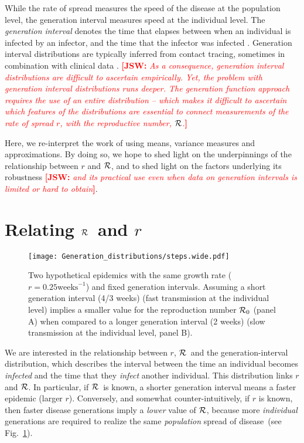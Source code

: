 \documentclass[12pt,]{article}
\newcommand{\RR}{\ensuremath{{\cal R}}}
\newcommand{\Rx}[1]{\ensuremath{{\cal R}_{#1}}}
\newcommand{\Ro}{\Rx{0}}
\newcommand{\fref}[1]{Fig.~\ref{fig:#1}}
\newcommand{\comment}[3]{\textcolor{#1}{\textbf{[#2: }\textit{#3}\textbf{]}}}
\newcommand{\jsw}[1]{\comment{red}{JSW}{#1}}
\begin{document}
While the rate of spread measures the speed of the disease at the population level, the generation interval measures speed at the individual level.
The \emph{generation interval} denotes the time that elapses between when an individual is infected by an infector, and the time that the infector was infected \cite{Sven07}.
Generation interval distributions are typically inferred from contact tracing, sometimes in combination with clinical data \cite{GenerationMeasurement}.
\jsw{As a consequence, generation interval distributions are difficult to ascertain empirically. Yet, the problem with generation interval distributions runs deeper. The generation function approach requires the use of an entire distribution -- which makes it difficult to ascertain which features of the distributions are essential to connect measurements of the rate of spread $r$, with the reproductive number, \RR.}

Here, we re-interpret the work of \cite{WallLips07} using means, variance measures and approximations.
By doing so, we hope to shed light on the underpinnings of the relationship between $r$ and \RR, and to shed light on the factors underlying its robustness \jsw{and its practical use even when data on generation intervals is limited or hard to obtain}.

\section{Relating \RR\ and $r$}

\begin{figure}[htbp] \centering
	\texttt{[image: Generation\_distributions/steps.wide.pdf]}
	\caption{Two hypothetical epidemics with the same growth rate ($r=0.25 \mathrm{weeks}^{-1}$) and fixed generation intervals.  Assuming a short generation interval (4/3 weeks) (fast transmission at the individual level) implies a smaller value for the reproduction number $\Ro$ (panel A) when compared to a longer generation interval (2 weeks) (slow transmission at the individual level, panel B). 
	\label{fig:link}}
\end{figure}

We are interested in the relationship between $r$, \RR~and the generation-interval distribution, which describes the interval between the time an individual becomes \emph{infected} and the time that they \emph{infect} another individual.
This distribution links $r$ and \RR. In particular, if \RR~is known, a shorter generation interval means a faster epidemic (larger $r$). Conversely, and somewhat counter-intuitively, if $r$ is known, then faster disease generations imply a \emph{lower} value of \RR, because more \emph{individual} generations are required to realize the same \emph{population} spread of disease~(see \fref{link}).
\end{document}
